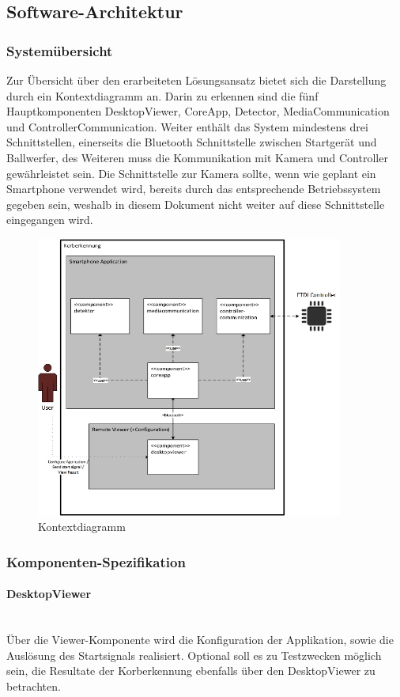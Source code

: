 \subsection{Software-Architektur}
	\subsubsection{Systemübersicht}
	Zur Übersicht über den erarbeiteten Lösungsansatz bietet sich die Darstellung durch ein Kontextdiagramm an. Darin zu erkennen sind die fünf Hauptkomponenten  DesktopViewer, CoreApp, Detector, MediaCommunication und ControllerCommunication. Weiter enthält das System mindestens drei Schnittstellen, einerseits die Bluetooth Schnittstelle zwischen Startgerät und Ballwerfer, des Weiteren muss die Kommunikation mit Kamera und Controller gewährleistet sein. Die Schnittstelle zur Kamera sollte, wenn wie geplant ein Smartphone verwendet wird, bereits durch das entsprechende Betriebssystem gegeben sein, weshalb in diesem Dokument nicht weiter auf diese Schnittstelle eingegangen wird. 
\begin{figure}[h!]
		\centering
		\includegraphics[width=0.9\textwidth]{Enddokumentation/Loesungskonzept/Bilder/Kontextdiagramm_v2.jpg}
		\caption{Kontextdiagramm}		
\end{figure}


	\subsubsection{Komponenten-Spezifikation}
		\paragraph{DesktopViewer}$~~$\vspace{2mm}\\
		Über die Viewer-Komponente wird die Konfiguration der Applikation, sowie die Auslösung des Startsignals realisiert. Optional soll es zu Testzwecken möglich sein, die Resultate der Korberkennung ebenfalls über den DesktopViewer zu betrachten.
		
